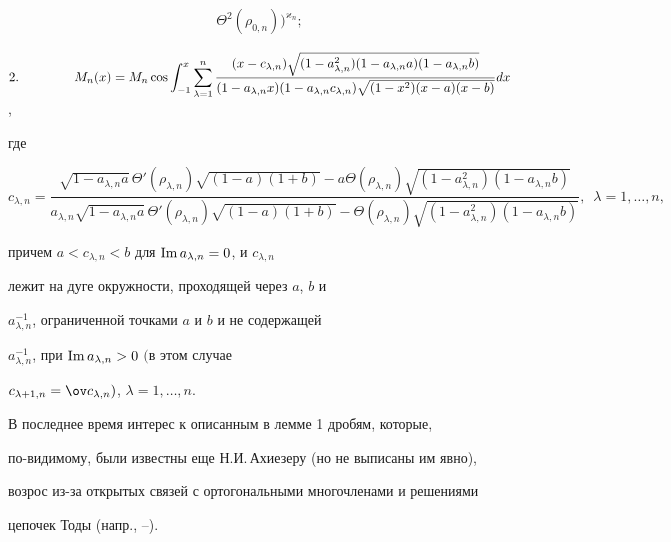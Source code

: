 {\begin{gather*}
{\Theta^2(\rho_{0,n})}\biggr)^{\varkappa_n};


\end{gather*}





$2.\hspace{1.5cm}\displaystyle


M_n(x)=M_n\cos\int^x_{-1}\sum^n_{\lambda=1}


\frac{(x-c_{\lambda,n})\sqrt{(1-a^2_{\lambda,n})


(1-a_{\lambda,n}a)(1-a_{\lambda,n}b)}}


{(1-a_{\lambda,n}x)(1-a_{\lambda,n}c_{\lambda,n})


\sqrt{(1-x^2)(x-a)(x-b)}}dx$,





\noindent где


$$


c_{\lambda,n}=


\frac{\sqrt{1-a_{\lambda,n}a}\,\Theta'(\rho_{\lambda,n})


\sqrt{(1-a)(1+b)}-a\Theta(\rho_{\lambda,n})


\sqrt{(1-a^2_{\lambda,n})(1-a_{\lambda,n}b)}}


{a_{\lambda,n}\sqrt{1-a_{\lambda,n}a}\,\Theta'(\rho_{\lambda,n})


\sqrt{(1-a)(1+b)}-\Theta(\rho_{\lambda,n})


\sqrt{(1-a^2_{\lambda,n})(1-a_{\lambda,n}b)}},\ \;\lambda=1,\dotsc,n,


$$


причем $a<c_{\lambda,n}<b$ для $\operatorname{Im} a_{\lambda,n}=0$, и $c_{\lambda,n}$


лежит на дуге окружности, проходящей через $a$, $b$ и


$a^{-1}_{\lambda,n}$, ограниченной точками $a$ и $b$ и не содержащей


$a^{-1}_{\lambda,n}$, при $\operatorname{Im} a_{\lambda,n}>0$ $($в этом случае


$c_{\lambda+1,n}=\ov c_{\lambda,n})$, $\lambda=1,\dotsc,n$.


}





\begin{note}


В последнее время интерес к описанным в лемме 1 дробям, которые,


по-видимому, были известны еще Н.И.\,Ахиезеру (но не выписаны им явно),


возрос из-за открытых связей с ортогональными многочленами и решениями


цепочек Тоды (напр., \cite{10}--\cite{13}).


\end{note}



